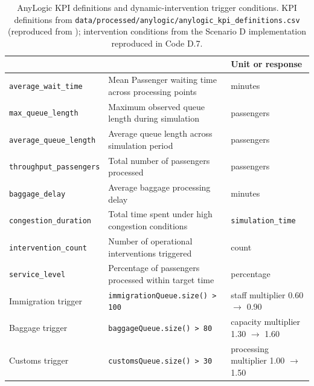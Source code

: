 \begin{table}[H]
    \centering
    \captionsetup{justification=raggedright,singlelinecheck=false}
    \caption[AnyLogic KPI definitions and dynamic-intervention triggers]{AnyLogic KPI definitions and dynamic-intervention trigger conditions. KPI definitions from \texttt{data/processed/anylogic/anylogic\_kpi\_definitions.csv} (reproduced from ); intervention conditions from the Scenario D implementation reproduced in Code D.7.}
    \label{tab:appendix-c-kpi-definitions-triggers}
    \footnotesize
    \setlength{\tabcolsep}{4pt}
    \renewcommand{\arraystretch}{1.20}
    \begin{tabularx}{\textwidth}{
        |>{\raggedright\arraybackslash}p{3.3cm}
        |>{\raggedright\arraybackslash}X
        |>{\centering\arraybackslash}p{3.5cm}|
    }
        \hline
        \multicolumn{1}{|c|}{\textbf{Element}} &
        \multicolumn{1}{c|}{\textbf{Definition or trigger condition}} &
        \textbf{Unit or response} \\
        \hline
        \nolinkurl{average_wait_time} &
        Mean Passenger waiting time across processing points &
        minutes \\
        \hline
        \nolinkurl{max_queue_length} &
        Maximum observed queue length during simulation &
        passengers \\
        \hline
        \nolinkurl{average_queue_length} &
        Average queue length across simulation period &
        passengers \\
        \hline
        \nolinkurl{throughput_passengers} &
        Total number of passengers processed &
        passengers \\
        \hline
        \nolinkurl{baggage_delay} &
        Average baggage processing delay &
        minutes \\
        \hline
        \nolinkurl{congestion_duration} &
        Total time spent under high congestion conditions &
        \nolinkurl{simulation_time} \\
        \hline
        \nolinkurl{intervention_count} &
        Number of operational interventions triggered &
        count \\
        \hline
        \nolinkurl{service_level} &
        Percentage of passengers processed within target time &
        percentage \\
        \hline
        Immigration trigger &
        \texttt{immigrationQueue.size() > 100} &
        staff multiplier 0.60 $\rightarrow$ 0.90 \\
        \hline
        Baggage trigger &
        \texttt{baggageQueue.size() > 80} &
        capacity multiplier 1.30 $\rightarrow$ 1.60 \\
        \hline
        Customs trigger &
        \texttt{customsQueue.size() > 30} &
        processing multiplier 1.00 $\rightarrow$ 1.50 \\
        \hline
    \end{tabularx}
\end{table}

